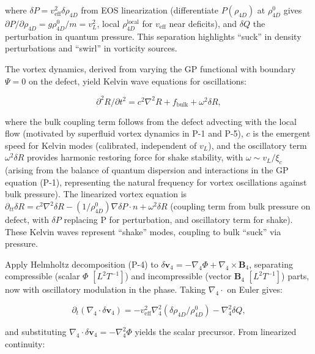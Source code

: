 where $\delta P = v_{\text{eff}}^2 \delta \rho_{4D}$ from EOS linearization (differentiate $P(\rho_{4D})$ at $\rho_{4D}^0$ gives $\partial P / \partial \rho_{4D} = g \rho_{4D}^0 / m = v_L^2$, local $\rho_{4D}^{\text{local}}$ for $v_{\text{eff}}$ near deficits), and $\delta Q$ the perturbation in quantum pressure. This separation highlights ``suck'' in density perturbations and ``swirl'' in vorticity sources.

The vortex dynamics, derived from varying the GP functional with boundary $\Psi=0$ on the defect, yield Kelvin wave equations for oscillations:

\begin{equation}
\partial^2 R / \partial t^2 = c^2 \nabla^2 R + f_{\text{bulk}} + \omega^2 \delta R,
\end{equation}

where the bulk coupling term follows from the defect advecting with the local flow (motivated by superfluid vortex dynamics in P-1 and P-5), $c$ is the emergent speed for Kelvin modes (calibrated, independent of $v_L$), and the oscillatory term $\omega^2 \delta R$ provides harmonic restoring force for shake stability, with $\omega \sim v_L / \xi_c$ (arising from the balance of quantum dispersion and interactions in the GP equation (P-1), representing the natural frequency for vortex oscillations against bulk pressure). The linearized vortex equation is $\partial_{tt} \delta R = c^2 \nabla^2 \delta R - (1 / \rho_{4D}^0) \nabla \delta P \cdot n + \omega^2 \delta R$ (coupling term from bulk pressure on defect, with $\delta P$ replacing P for perturbation, and oscillatory term for shake). These Kelvin waves represent ``shake'' modes, coupling to bulk ``suck'' via pressure.

Apply Helmholtz decomposition (P-4) to $\delta \mathbf{v}_4 = -\nabla_4 \Phi + \nabla_4 \times \mathbf{B}_4$, separating compressible (scalar $\Phi$ $[L^2 T^{-1}]$) and incompressible (vector $\mathbf{B}_4$ $[L^2 T^{-1}]$) parts, now with oscillatory modulation in the phase. Taking $\nabla_4 \cdot$ on Euler gives:

\begin{equation}
\partial_t (\nabla_4 \cdot \delta \mathbf{v}_4) = -v_{\text{eff}}^2 \nabla_4^2 (\delta \rho_{4D} / \rho_{4D}^0) - \nabla_4^2 \delta Q,
\end{equation}

and substituting $\nabla_4 \cdot \delta \mathbf{v}_4 = -\nabla_4^2 \Phi$ yields the scalar precursor. From linearized continuity:

